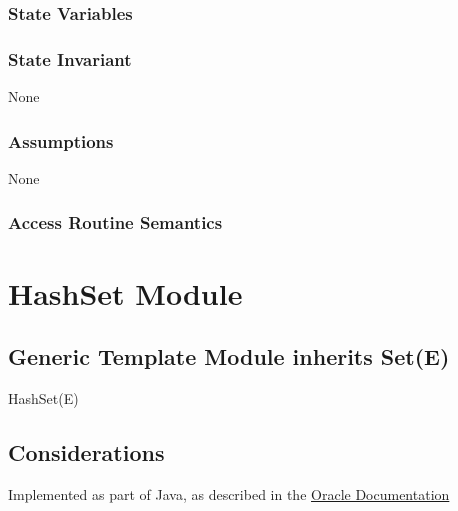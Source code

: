 \documentclass[12pt]{article}
\begin{document}
\subsubsection* {State Variables}



\subsubsection* {State Invariant}

None

\subsubsection* {Assumptions}

None

\subsubsection* {Access Routine Semantics}


\newpage

\section* {HashSet Module}

\subsection* {Generic Template Module inherits Set(E)}

HashSet(E)

\subsection* {Considerations}

Implemented as part of Java, as described in the
\href{https://docs.oracle.com/javase/8/docs/api/java/util/HashSet.html} {Oracle Documentation}

\newpage
\end{document}
